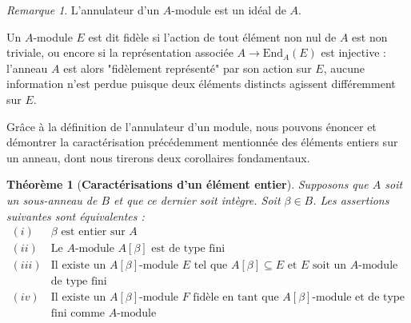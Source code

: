 \documentclass[10pt, twoside]{article}
\theoremstyle{plain}
\newtheorem{theorem}{Théorème}[section]
\theoremstyle{definition}
\theoremstyle{plain}
\theoremstyle{plain}
\theoremstyle{definition}
\theoremstyle{remark}
\newtheorem*{remark}{Remarque}
\begin{document}
\begin{remark}
    L'annulateur d'un $A$-module est un idéal de $A$.
\end{remark}

Un $A$-module $E$ est dit fidèle si l'action de tout élément non nul de $A$ est non triviale, ou encore si la représentation associée $A \longrightarrow \text{End}_A(E)$ est injective : l'anneau $A$ est alors "fidèlement représenté" par son action sur $E$, aucune information n'est perdue puisque deux éléments distincts agissent différemment sur $E$.

 Grâce à la définition de l'annulateur d'un module, nous pouvons énoncer et démontrer la caractérisation précédemment mentionnée des éléments entiers sur un anneau, dont nous tirerons deux corollaires fondamentaux.

\begin{theorem}[\textbf{Caractérisations d'un élément entier}]\label{thm:lasse entier}
    Supposons que $A$ soit un sous-anneau de $B$ et que ce dernier soit intègre. Soit $\beta \in B$. Les assertions suivantes sont équivalentes :\\
    $\begin{array}{ll}
        (i) &\beta \text{ est  entier sur } A\\
        (ii) &\text{Le } A \text{-module } A[\beta] \text{ est de type fini} \\
        (iii) &\text{Il existe un } A[\beta] \text{-module } E \text{ tel que } A[\beta] \subseteq E \text{ et } E \text{ soit un } A \text{-module} \\ &\text{de type fini} \\
        (iv) &\text{Il existe un } A[\beta] \text{-module } F \text{ fidèle en tant que } A[\beta] \text{-module et de type} \\
     &\text{fini comme } A \text{-module}
    \end{array}$
\end{theorem}
\end{document}
